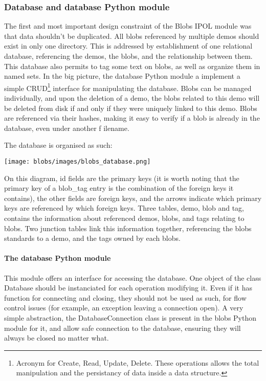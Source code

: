 \subsubsection{Database and database Python module}
The first and most important design constraint of the Blobs IPOL module was that data shouldn't be duplicated. All blobs referenced by multiple demos should exist in only one directory. This is addressed by establishment of one relational database, referencing the demos, the blobs, and the relationship between them. This database also permits to tag some text on blobs, as well as organize them in named sets. In the big picture, the database Python module a implement a simple CRUD\footnote{Acronym for Create, Read, Update, Delete. These operations allows the total manipulation and the persistancy of data inside a data structure.} interface for manipulating the database. Blobs can be managed individually, and upon the deletion of a demo, the blobs related to this demo will be deleted from disk if and only if they were uniquely linked to this demo. Blobs are referenced via their hashes, making it easy to verify if a blob is already in the database, even under another f
ilename.

The database is organised as such:

\texttt{[image: blobs/images/blobs\_database.png]}

On this diagram, id fields are the primary keys (it is worth noting that the primary key of a blob\_tag entry is the combination of the foreign keys it contains), the other fields are foreign keys, and the arrows indicate which primary keys are referenced by which foreign keys. 
Three tables, demo, blob and tag, contains the information about referenced demos, blobs, and tags relating to blobs. Two junction tables link this information together, referencing the blobs standards to a demo, and the tags owned by each blobs.

\paragraph{The database Python module\\}
This module offers an interface for accessing the database. One object of the class Database should be instanciated for each operation modifying it. Even if it has function for connecting and closing, they should not be used as such, for flow control issues (for example, an exception leaving a connection open). A very simple abstraction, the DatabaseConnection class is present in the blobs Python module for it, and allow safe connection to the database, ensuring they will always be closed no matter what.

